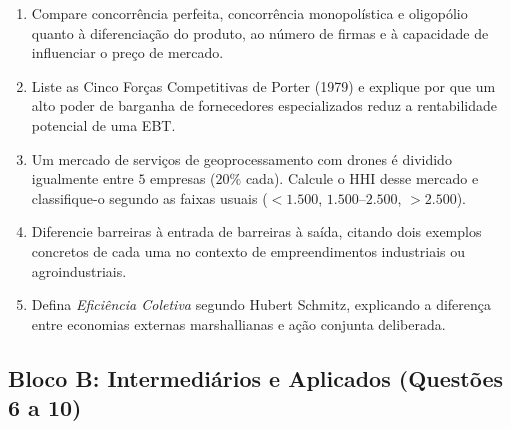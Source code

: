 \begin{enumerate}[leftmargin=1.6em, itemsep=6pt]
  \item Compare concorrência perfeita, concorrência monopolística e oligopólio quanto à diferenciação do produto, ao número de firmas e à capacidade de influenciar o preço de mercado.
  \espacoResolucao[1.8cm]

  \item Liste as Cinco Forças Competitivas de Porter (1979) e explique por que um alto poder de barganha de fornecedores especializados reduz a rentabilidade potencial de uma EBT.
  \espacoResolucao[1.8cm]

  \item Um mercado de serviços de geoprocessamento com drones é dividido igualmente entre $5$ empresas ($20\%$ cada). Calcule o $\text{HHI}$ desse mercado e classifique-o segundo as faixas usuais ($<1.500$, $1.500$--$2.500$, $>2.500$).
  \espacoResolucao[1.8cm]

  \item Diferencie barreiras à entrada de barreiras à saída, citando dois exemplos concretos de cada uma no contexto de empreendimentos industriais ou agroindustriais.
  \espacoResolucao[1.8cm]

  \item Defina \textit{Eficiência Coletiva} segundo Hubert Schmitz, explicando a diferença entre economias externas marshallianas e ação conjunta deliberada.
  \espacoResolucao[1.8cm]
\end{enumerate}

\subsection*{Bloco B: Intermediários e Aplicados (Questões 6 a 10)}

